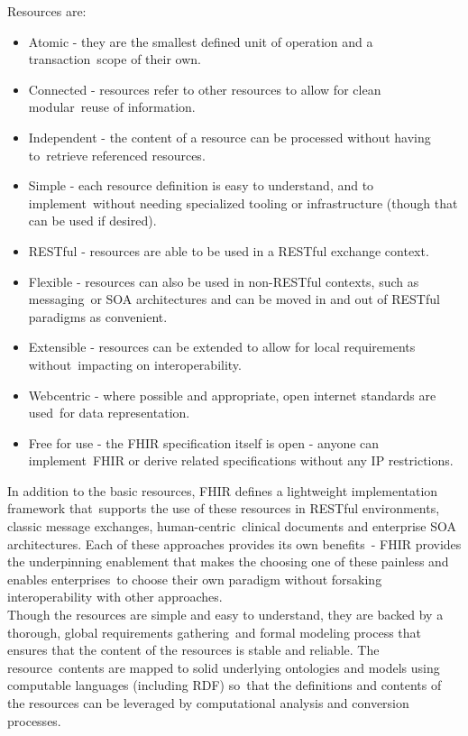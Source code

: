 \documentclass[DIV=calc, paper=a4, fontsize=12pt, onecolumn]{scrartcl}	 %
\begin{document}
  Resources are:\

  \begin{itemize}
    \itemsep0ex
    \item Atomic - they are the smallest defined unit of operation and a transaction\
    scope of their own.\
    \item Connected - resources refer to other resources to allow for clean modular\
    reuse of information.\
    \item Independent - the content of a resource can be processed without having to\
    retrieve referenced resources.\
    \item Simple - each resource definition is easy to understand, and to implement\
    without needing specialized tooling or infrastructure (though that can be used if desired).\
    \item RESTful - resources are able to be used in a RESTful exchange context.\
    \item Flexible - resources can also be used in non-RESTful contexts, such as messaging\
    or SOA architectures and can be moved in and out of RESTful paradigms as convenient.\
    \item Extensible - resources can be extended to allow for local requirements without\
    impacting on interoperability.\
    \item Webcentric - where possible and appropriate, open internet standards are used\
    for data representation.\
    \item Free for use - the FHIR specification itself is open - anyone can implement\
    FHIR or derive related specifications without any IP restrictions.\
  \end{itemize}

  \noindent In addition to the basic resources, FHIR defines a lightweight implementation framework that\
  supports the use of these resources in RESTful environments, classic message exchanges, human-centric\
  clinical documents and enterprise SOA architectures. Each of these approaches provides its own benefits\ 
  - FHIR provides the underpinning enablement that makes the choosing one of these painless and enables enterprises\
  to choose their own paradigm without forsaking interoperability with other approaches.\\

  \noindent Though the resources are simple and easy to understand, they are backed by a thorough, global requirements gathering\
  and formal modeling process that ensures that the content of the resources is stable and reliable. The resource\
  contents are mapped to solid underlying ontologies and models using computable languages (including RDF) so\
  that the definitions and contents of the resources can be leveraged by computational analysis and conversion processes.\\
\end{document}
